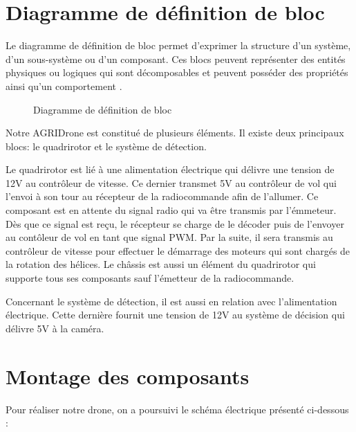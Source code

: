 \section{Diagramme de définition  de bloc  }

Le diagramme de définition de bloc permet d'exprimer la structure d'un système, d'un sous-système ou d'un composant. Ces blocs peuvent représenter des entités physiques ou logiques qui sont décomposables et peuvent posséder des propriétés ainsi qu'un comportement \cite{siloged}.


\begin{figure}[H] 
	\begin{center} 
		\centering
		\hspace*{-0.65cm}	
	\end{center}
	
	\caption{Diagramme de définition de bloc}
	
	\end {figure}
	Notre AGRIDrone  est constitué de plusieurs éléments. Il existe deux principaux blocs: le quadrirotor et le système de détection.
	
	Le quadrirotor est lié à une alimentation électrique qui  délivre une tension de 12V au contrôleur de vitesse. Ce dernier transmet 5V au contrôleur de vol qui l'envoi à son tour au récepteur de la radiocommande afin de l'allumer. Ce composant est en attente du signal radio qui va être transmis par l'émmeteur. Dès que ce signal est reçu, le récepteur se charge de le décoder puis de l'envoyer au contôleur de vol en tant que signal PWM. Par la suite, il sera transmis au contrôleur de vitesse pour effectuer le démarrage des moteurs qui sont chargés de la rotation des hélices. Le châssis est aussi un élément du quadrirotor qui supporte tous ses composants sauf l'émetteur de la radiocommande.
	
	Concernant le système de détection, il est aussi en relation avec l'alimentation électrique. Cette dernière fournit une tension de 12V au système de décision qui délivre 5V à la caméra.
		\section{Montage des composants}
	Pour réaliser notre drone, on a poursuivi le schéma électrique présenté ci-dessous :
	
